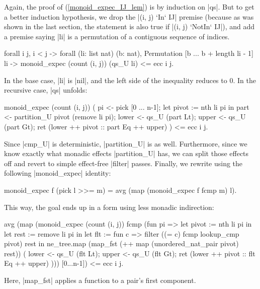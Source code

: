 \documentclass[runningheads]{llncs}
\begin{document}
Again, the proof of (\ref{monoid_expec_IJ_lem}) 
is by induction on |qs|. But to get a better induction hypothesis, we drop the |(i, j) `In` IJ| premise (because as was shown in the last section, the statement is also true if |(i, j) `NotIn` IJ|), and add a premise saying |li| is a permutation of a contiguous sequence of indices.
\begin{code}
  forall i j, i < j -> forall (li: list nat) (b: nat), Permutation [b ... b + length li - 1] li ->
    monoid_expec (count (i, j)) (qs_U li) <= ecc i j.
\end{code}
In the base case, |li| is |nil|, and the left side of the inequality reduces to 0. In the recursive case, |qs| unfolds:
\begin{code}
monoid_expec (count (i, j)) (
    pi <- pick [0 ... n-1];
    let pivot := nth li pi in
    part <- partition_U pivot (remove li pi);
    lower <- qs_U (part Lt);
    upper <- qs_U (part Gt);
    ret (lower ++ pivot :: part Eq ++ upper)
  ) <= ecc i j.
\end{code}
Since |cmp_U| is deterministic, |partition_U| is as well. Furthermore, since
we know exactly what monadic effects |partition_U| has, we can split those
effects off and revert to simple effect-free |filter| passes. Finally, we rewrite using the following |monoid_expec| identity:
\begin{code}
  monoid_expec f (pick l >>= m) = avg (map (monoid_expec f fcmp m) l).
\end{code}
This way, the goal ends up in a form using less monadic indirection:
\begin{code}
avg (map (monoid_expec (count (i, j)) fcmp (fun pi =>
    let pivot := nth li pi in
    let rest := remove li pi in
    let flt := fun c => filter ((= c) fcmp lookup_cmp pivot) rest in
    ne_tree.map (map_fst (++ map (unordered_nat_pair pivot) rest)) (
      lower <- qs_U (flt Lt);
      upper <- qs_U (flt Gt);
      ret (lower ++ pivot :: flt Eq ++ upper)
    ))) [0...n-1]) <= ecc i j.
\end{code}
Here, |map_fst| applies a function to a pair's first component.
\end{document}
